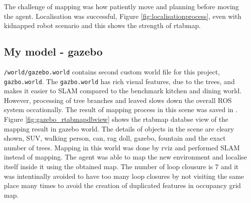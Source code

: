\documentclass[10pt,journal,compsoc]{IEEEtran}
\begin{document}
The challenge of mapping was how patiently move and planning before moving the agent. Localisation was successful, Figure \ref{fig:localisationprocess}, even with kidnapped robot scenario and this shows the strength of rtabmap.

\subsection{My model - gazebo}

\verb!/world/gazebo.world! contains second custom world file for this project, \verb!gazbo.world!. The  \verb!gazbo.world! has rich visual features, due to the trees, and makes it easier to SLAM compared to the benchmark kitchen and dining world. However, processing of tree branches and leaved slows down the overall ROS system occationally. The result of mapping process in this scene was saved in . Figure \ref{fig:gazebo_rtabmapdbview} shows the rtabmap databse view of the mapping result in gazebo world. The details of objects in the scene are cleary shown, SUV, walking person, can, rag doll, gazebo, fountain and the exact number of trees. Mapping in this world was done by rviz and performed SLAM instead of mapping. The agent was able to map the new environment and localise itself inside it using the obtained map. The number of loop clousure is 7 and it was intentinally avoided to have too many loop closures by not visiting the same place many times to avoid the creation of duplicated features in occupancy grid map.
\end{document}
